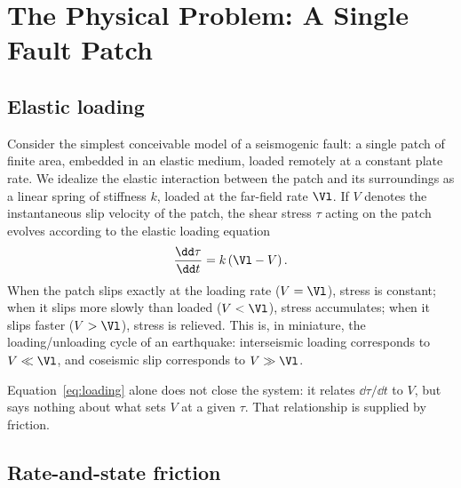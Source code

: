 \section{The Physical Problem: A Single Fault Patch}

\subsection{Elastic loading}

Consider the simplest conceivable model of a seismogenic fault: a single patch of finite area, embedded in an elastic medium, loaded remotely at a constant plate rate. We idealize the elastic interaction between the patch and its surroundings as a linear spring of stiffness $k$, loaded at the far-field rate $\Vl$. If $V$ denotes the instantaneous slip velocity of the patch, the shear stress $\tau$ acting on the patch evolves according to the elastic loading equation
\begin{equation}
\frac{\dd \tau}{\dd t} = k\left(\Vl - V\right).
\label{eq:loading}
\end{equation}
When the patch slips exactly at the loading rate ($V = \Vl$), stress is constant; when it slips more slowly than loaded ($V < \Vl$), stress accumulates; when it slips faster ($V > \Vl$), stress is relieved. This is, in miniature, the loading/unloading cycle of an earthquake: interseismic loading corresponds to $V \ll \Vl$, and coseismic slip corresponds to $V \gg \Vl$.

Equation~\eqref{eq:loading} alone does not close the system: it relates $\dd\tau/\dd t$ to $V$, but says nothing about what sets $V$ at a given $\tau$. That relationship is supplied by friction.

\subsection{Rate-and-state friction}

